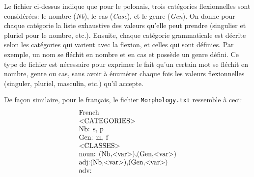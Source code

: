 \bigskip
\noindent Le fichier ci-dessus indique que pour le polonais, trois catégories flexionnelles sont
considérées: le nombre (\emph{Nb}), le cas (\emph{Case}), et le genre (\emph{Gen}). 
On donne pour chaque catégorie la liste exhaustive des valeurs qu'elle peut prendre (singulier et
pluriel pour le nombre, etc.).
Ensuite, chaque catégorie grammaticale est décrite selon les catégories qui varient avec la flexion,
et celles qui sont définies.
Par exemple, un nom se fléchit en nombre et en cas et possède un genre défini. 
Ce type de fichier est nécessaire pour exprimer le fait qu'un certain mot se fléchit en  nombre, genre ou cas, sans avoir à énumérer chaque fois les valeurs flexionnelles (singuler, pluriel, masculin, etc.) qu'il accepte.

\bigskip
\noindent De façon similaire, pour le français, le fichier \verb+Morphology.txt+ ressemble à ceci:
\[
\begin{array}[c]{l}
$French$ \\
$$<$CATEGORIES$>$$ \\
$Nb: s, p$ \\
$Gen: m, f$ \\
$$<$CLASSES$>$$\\
$noun: (Nb,$<$var$>$),(Gen,$<$var$>$)$ \\
$adj:(Nb,$<$var$>$),(Gen,$<$var$>$)$ \\
$adv:$
\end{array}
\]

